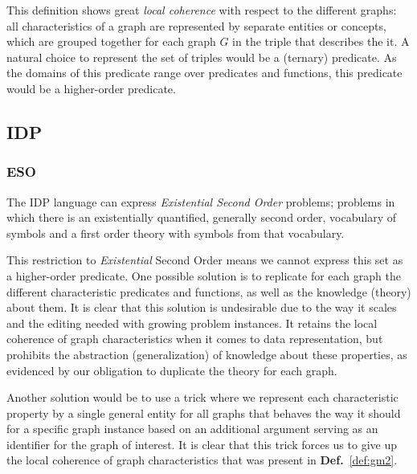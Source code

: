 \documentclass{article}
\theoremstyle{definition}
\begin{document}
This definition shows great \emph{local coherence} with respect to the different graphs: all characteristics of a graph are represented by separate entities or concepts, which are grouped together for each graph $G$ in the triple that describes the it.
A natural choice to represent the set of triples would be a (ternary) predicate.
As the domains of this predicate range over predicates and functions, this predicate would be a higher-order predicate.


\subsection{IDP}
\subsubsection{ESO}
The IDP language can express \emph{Existential Second Order} problems; problems in which there is an existentially quantified, generally second order, vocabulary of symbols and a first order theory with symbols from that vocabulary.

This restriction to \emph{Existential} Second Order means we cannot express this set as a higher-order predicate.
One possible solution is to replicate for each graph the different characteristic predicates and functions, as well as the knowledge (theory) about them.
It is clear that this solution is undesirable due to the way it scales and the editing needed with growing problem instances.
It retains the local coherence of graph characteristics when it comes to data representation, but prohibits the abstraction (generalization) of knowledge about these properties, as evidenced by our obligation to duplicate the theory for each graph.

Another solution would be to use a trick where we represent each characteristic property by a single general entity for all graphs that behaves the way it should for a specific graph instance based on an additional argument serving as an identifier for the graph of interest.
It is clear that this trick forces us to give up the local coherence of graph characteristics that was present in \textbf{Def.}~\ref{def:gm2}.

\end{document}
